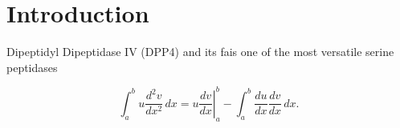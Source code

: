 \section{Introduction}
\label{intro} 

Dipeptidyl Dipeptidase IV (DPP4) and its fais one of the most versatile serine peptidases  

\begin{equation}
\label{eqn:drag}
	\int_a^bu\frac{d^2v}{dx^2}\,dx
	=\left.u\frac{dv}{dx}\right|_a^b
	-\int_a^b\frac{du}{dx}\frac{dv}{dx}\,dx.
\end{equation}
